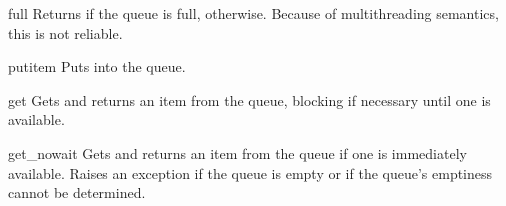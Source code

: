 \begin{funcdesc}{full}{}
Returns  if the queue is full,  otherwise.  Because of
multithreading semantics, this is not reliable.
\end{funcdesc}

\begin{funcdesc}{put}{item}
Puts  into the queue.
\end{funcdesc}

\begin{funcdesc}{get}{}
Gets and returns an item from the queue, blocking if necessary until
one is available.
\end{funcdesc}

\begin{funcdesc}{get_nowait}{}
Gets and returns an item from the queue if one is immediately
available.  Raises an  exception if the queue is
empty or if the queue's emptiness cannot be determined.
\end{funcdesc}
